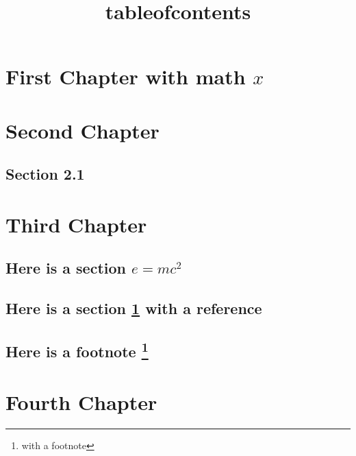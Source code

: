 \documentclass{amsbook}
\title{tableofcontents}
\begin{document}
\maketitle

\tableofcontents

\chapter{First Chapter with math $x$}
\label{chap:1}

\chapter{Second Chapter}
\label{chap:2}

\section{Section 2.1}

\chapter{Third Chapter}

\section{Here is a section $e = mc^2$}

\section{Here is a section \ref{chap:1} with a reference}

\section{Here is a footnote \protect\footnote{with a footnote}}

\chapter{Fourth Chapter}
\end{document}

